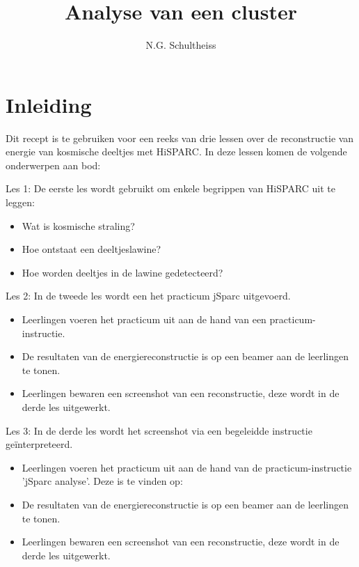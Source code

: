 

\title{Analyse van een cluster}
\author{N.G. Schultheiss}



\maketitle

\section{Inleiding}

Dit recept is te gebruiken voor een reeks van drie lessen over de reconstructie van energie van kosmische deeltjes met HiSPARC. In deze lessen komen de volgende onderwerpen aan bod:

Les 1: De eerste les wordt gebruikt om enkele begrippen van HiSPARC uit te leggen:

\begin{itemize}
\item Wat is kosmische straling?
\item Hoe ontstaat een deeltjeslawine?
\item Hoe worden deeltjes in de lawine gedetecteerd?
\end{itemize}

Les 2: In de tweede les wordt een het practicum jSparc uitgevoerd.

\begin{itemize}
\item Leerlingen voeren het practicum uit aan de hand van een practicum-instructie.
\item De resultaten van de energiereconstructie is op een beamer aan de leerlingen te tonen.
\item Leerlingen bewaren een screenshot van een reconstructie, deze wordt in de derde les uitgewerkt.
\end{itemize}

Les 3: In de derde les wordt het screenshot via een begeleidde instructie ge\"interpreteerd.
\begin{itemize}
\item Leerlingen voeren het practicum uit aan de hand van de practicum-instructie 'jSparc analyse'. Deze is te vinden op: \url{}
\item De resultaten van de energiereconstructie is op een beamer aan de leerlingen te tonen.
\item Leerlingen bewaren een screenshot van een reconstructie, deze wordt in de derde les uitgewerkt.
\end{itemize}


